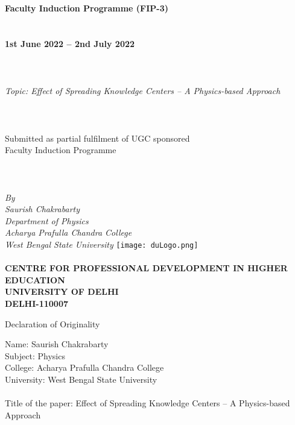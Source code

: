 \documentclass[a4paper,12pt]{article}
\begin{document}
\thispagestyle{empty}
\begin{center}
  \large{
    {\bf Faculty Induction Programme (FIP-3)\\~\\~\\ 
      1st June 2022 -- 2nd July 2022}\\~\\~\\~\\
    {\em Topic: Effect of Spreading Knowledge Centers --
      A Physics-based Approach}\\~\\~\\~\\
    Submitted as partial fulfilment of UGC sponsored\\ 
    Faculty Induction Programme\\~\\~\\~\\
    {\em By\\
      Saurish Chakrabarty\\
      Department of Physics\\
      Acharya Prafulla Chandra College\\ 
      West Bengal State University}
    \vfill
    \texttt{[image: duLogo.png]}\\~\\
    {\bf CENTRE FOR PROFESSIONAL DEVELOPMENT IN HIGHER EDUCATION\\ 
      UNIVERSITY OF DELHI\\
      DELHI-110007}}
\end{center}
\clearpage\pagebreak


\begin{center}
  Declaration of Originality 
\end{center}

\noindent
Name: Saurish Chakrabarty\\
Subject: Physics\\
College: Acharya Prafulla Chandra College\\
University: West Bengal State University\\~\\



\noindent
Title of the paper: Effect of Spreading Knowledge Centers -- A Physics-based Approach\\~\\
\end{document}
